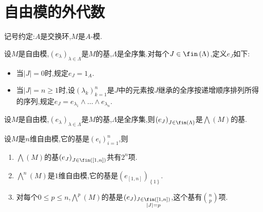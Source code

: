\section{自由模的外代数}

记号约定:$A$是交换环,$M$是$A$-模.

\begin{definition}{}{}
	设$M$是自由模,$\left(e_{\lambda}\right)_{\lambda\in\Lambda}$是$M$的基,$\Lambda$是全序集.对每个$J\in\fin\left(\Lambda\right)$,定义$e_{J}$如下:
	\begin{itemize}
		\item 当$\left|J\right|=0$时,规定$e_{J}=1_{A}$.
		\item 当$\left|J\right|=n\geq 1$时,设$\left(\lambda_{k}\right)_{k=1}^{n}$是$J$中的元素按$J$继承的全序按递增顺序排列所得的序列,规定$e_{J}=e_{\lambda_{1}}\wedge\ldots\wedge e_{\lambda_{n}}$.
	\end{itemize}
\end{definition}

\begin{theorem}{}{}
	设$M$是自由模,$\left(e_{\lambda}\right)_{\lambda\in\Lambda}$是$M$的基,$\Lambda$是全序集,则$\left(e_{J}\right)_{J\in\fin\left(\Lambda\right)}$是$\bigwedge\left(M\right)$的基.
\end{theorem}

\begin{corollary}{}{}
	设$M$是$n$维自由模,它的基是$\left(e_{i}\right)_{i=1}^{n}$,则
	\begin{enumerate}
		\item $\bigwedge\left(M\right)$的基$\left(e_{J}\right)_{J\in\fin\left(\left[1,n\right]\right)}$共有$2^{n}$项.
		\item $\bigwedge\limits^{n}\left(M\right)$是$1$维自由模,它的基是$\left(e_{\left[1,n\right]}\right)_{\left\{1\right\}}$.
		\item 对每个$0\leq p\leq n$,$\bigwedge\limits^{p}\left(M\right)$的基是$\left(e_{J}\right)_{\substack{J\in\fin\left(\left[1,n\right]\right)\\ \left|J\right|=p}}$,这个基有$\binom{n}{p}$项.
	\end{enumerate}
\end{corollary}

